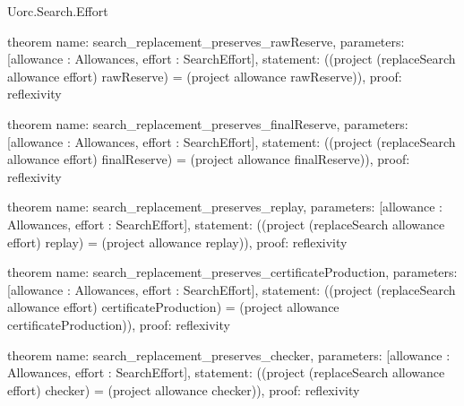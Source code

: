 \begin{lexlean}{Uorc.Search.Effort}
\begin{semanticmodule}
theorem{
  name: search_replacement_preserves_rawReserve,
  parameters: [allowance : Allowances, effort : SearchEffort],
  statement: ((project (replaceSearch allowance effort) rawReserve) = (project allowance rawReserve)),
  proof: reflexivity{}
}

theorem{
  name: search_replacement_preserves_finalReserve,
  parameters: [allowance : Allowances, effort : SearchEffort],
  statement: ((project (replaceSearch allowance effort) finalReserve) = (project allowance finalReserve)),
  proof: reflexivity{}
}

theorem{
  name: search_replacement_preserves_replay,
  parameters: [allowance : Allowances, effort : SearchEffort],
  statement: ((project (replaceSearch allowance effort) replay) = (project allowance replay)),
  proof: reflexivity{}
}

theorem{
  name: search_replacement_preserves_certificateProduction,
  parameters: [allowance : Allowances, effort : SearchEffort],
  statement: ((project (replaceSearch allowance effort) certificateProduction) = (project allowance certificateProduction)),
  proof: reflexivity{}
}

theorem{
  name: search_replacement_preserves_checker,
  parameters: [allowance : Allowances, effort : SearchEffort],
  statement: ((project (replaceSearch allowance effort) checker) = (project allowance checker)),
  proof: reflexivity{}
}
\end{semanticmodule}
\end{lexlean}
